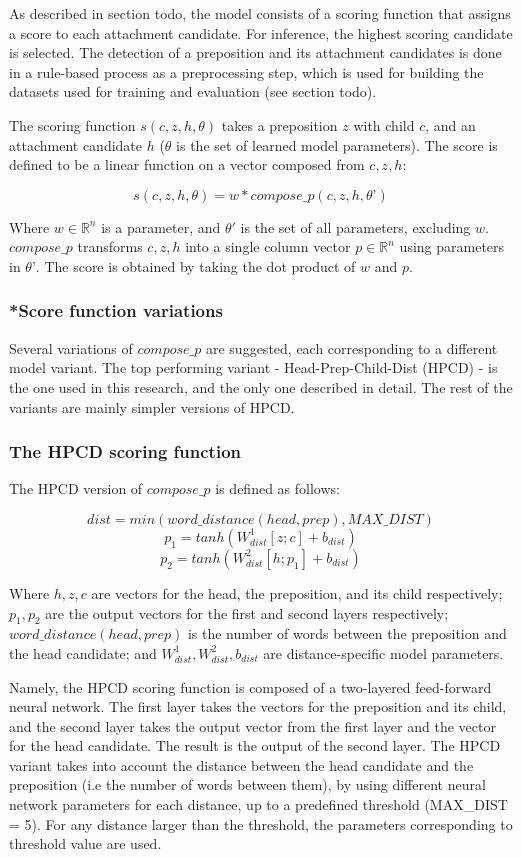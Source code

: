 As described in section todo, the model consists of a scoring function that assigns a score to each attachment candidate. For inference, the highest scoring candidate is selected. The detection of a preposition and its attachment candidates is done in a rule-based process as a preprocessing step, which is used for building the datasets used for training and evaluation (see section todo).

The scoring function $s(c, z, h, \theta)$ takes a preposition $z$ with child $c$, and an attachment candidate $h$ ($\theta$ is the set of learned model parameters). The score is defined to be a linear function on a vector composed from $c, z, h$:

$$s(c,z,h,\theta) = w * compose\_p(c,z,h, \theta’)$$

Where $w \in \mathbb{R}^n$ is a parameter, and $\theta'$ is the set of all parameters, excluding $w$. $compose\_p$ transforms $c, z, h$ into a single column vector $p \in \mathbb{R}^n$ using parameters in $\theta’$.  The score is obtained by taking the dot product of $w$ and $p$. 

\subsubsection{*Score function variations}
Several variations of $compose\_p$ are suggested, each corresponding to a different model variant. The top performing variant - Head-Prep-Child-Dist (HPCD) - is the one used in this research, and the only one described in detail. The rest of the variants are mainly simpler versions of HPCD.

\subsubsection{The HPCD scoring function}
The HPCD version of $compose\_p$ is defined as follows:

   $$ dist = min(word\_distance(head, prep), MAX\_DIST) $$
   $$ p_1 = tanh(W^1_{dist}[z;c] + b_{dist})   $$
   $$ p_2 = tanh(W^2_{dist}[h;p_1] + b_{dist}) $$

Where $h, z, c$ are vectors for the head, the preposition, and its child respectively; $p_1, p_2$ are the output vectors for the first and second layers respectively;
$word\_distance(head, prep)$ is the number of words between the preposition and the head candidate; and $ W^1_{dist}, W^2_{dist}, b_{dist}$ are distance-specific model parameters.

Namely, the HPCD scoring function is composed of a two-layered feed-forward neural network. The first layer takes the vectors for the preposition and its child, and the second layer takes the output vector from the first layer and the vector for the head candidate. The result is the output of the second layer. The HPCD variant takes into account the distance between the head candidate and the preposition (i.e the number of words between them), by using different neural network parameters for each distance, up to a predefined threshold (MAX\_DIST = 5). For any distance larger than the threshold, the parameters corresponding to threshold value are used.

